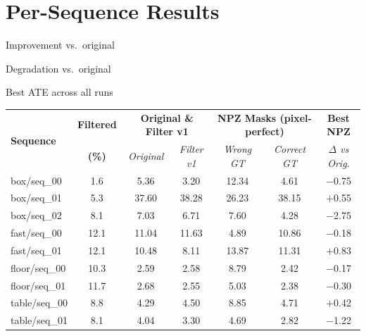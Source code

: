 \documentclass[a4paper, 10pt]{article}
\begin{document}
\section*{Per-Sequence Results}

\noindent
\colorbox{green_light}{\strut\quad} Improvement vs.\ original \quad
\colorbox{red_light}{\strut\quad} Degradation vs.\ original \quad
\colorbox{best_gold}{\strut\quad} Best ATE across all runs

\vspace{0.8em}

\noindent
\begin{tabular}{lc|cc|cc|c}
  \toprule
  \multirow{2}{*}{\textbf{Sequence}}
    & \textbf{Filtered}
    & \multicolumn{2}{c|}{\textbf{Original \& Filter v1}}
    & \multicolumn{2}{c|}{\textbf{NPZ Masks (pixel-perfect)}}
    & \textbf{Best NPZ} \\
  & \textbf{(\%)}
    & \textit{Original}
    & \textit{Filter v1}
    & \textit{Wrong GT}
    & \textit{Correct GT}
    & \textit{$\Delta$ vs Orig.} \\
  \midrule
  \rowcolor{row_alt}
  box/seq\_00  & 1.6  & 5.36 & \cellcolor{green_light}3.20  & 12.34 & \cellcolor{green_light}4.61  & $-$0.75 \\
  box/seq\_01  & 5.3  & 37.60 & \cellcolor{red_light}38.28 & \cellcolor{green_light}26.23 & \cellcolor{red_light}38.15 & $+$0.55 \\
  \rowcolor{row_alt}
  box/seq\_02  & 8.1  & 7.03 & \cellcolor{green_light}6.71  & 7.60  & \cellcolor{best_gold}4.28  & $-$2.75 \\
  fast/seq\_00 & 12.1 & 11.04 & \cellcolor{red_light}11.63 & \cellcolor{best_gold}4.89  & \cellcolor{green_light}10.86 & $-$0.18 \\
  \rowcolor{row_alt}
  fast/seq\_01 & 12.1 & 10.48 & \cellcolor{green_light}8.11  & 13.87 & \cellcolor{red_light}11.31 & $+$0.83 \\
  floor/seq\_00 & 10.3 & 2.59 & \cellcolor{green_light}2.58  & 8.79  & \cellcolor{best_gold}2.42  & $-$0.17 \\
  \rowcolor{row_alt}
  floor/seq\_01 & 11.7 & 2.68 & \cellcolor{green_light}2.55  & 5.03  & \cellcolor{best_gold}2.38  & $-$0.30 \\
  table/seq\_00 & 8.8  & 4.29 & \cellcolor{red_light}4.50  & 8.85  & \cellcolor{red_light}4.71  & $+$0.42 \\
  \rowcolor{row_alt}
  table/seq\_01 & 8.1  & 4.04 & \cellcolor{green_light}3.30  & 4.69  & \cellcolor{best_gold}2.82  & $-$1.22 \\

\end{tabular}
\end{document}
